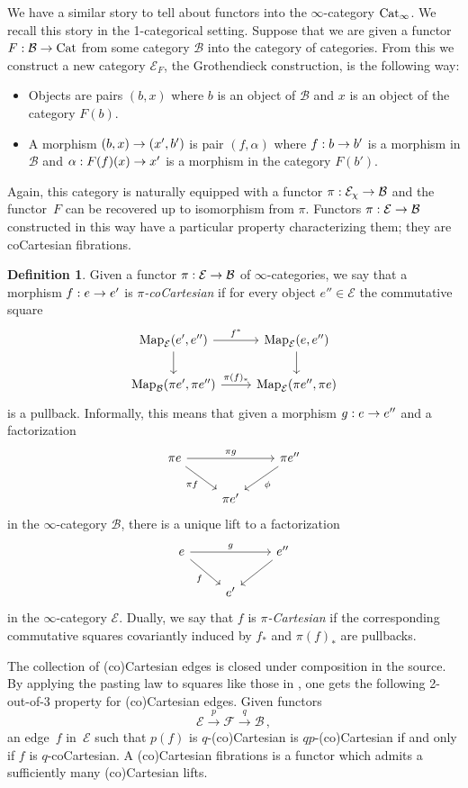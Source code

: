 \documentclass[10pt]{amsart}
\numberwithin{equation}{section}
\theoremstyle{definition}
\newtheorem{definition}[prop]{Definition}
\DeclareMathOperator{\Map}{Map}
\newcommand{\Cat}{\mathrm{Cat}\vphantom{t}}
\newcommand{\cB}{\mathcal{B}}
\newcommand{\cE}{\mathcal{E}}
\newcommand{\cF}{\mathcal{F}}
\renewcommand{\to}{\mathchoice{\longrightarrow}{\rightarrow}{}{}}
\begin{document}
	We have a similar story to tell about functors into the $\infty$-category $\Cat_{\infty}$.
	We recall this story in the 1-categorical setting.
	Suppose that we are given a functor $F : \mathcal{B} \to \Cat$ from some category $\mathcal{B}$ into the category of categories.
	From this we construct a new category $\mathcal{E}_{F}$, the Grothendieck construction, is the following way:
	\begin{itemize}
		\item Objects are pairs $(b,x)$ where $b$ is an object of $\mathcal{B}$ and $x$ is an object of the category $F(b)$.
		\item A morphism $(b,x) \to (x',b')$ is pair $(f,\alpha)$ where $f : b \to b'$ is a morphism in $\mathcal{B}$ and $\alpha : F(f)(x) \to x'$ is a morphism in the category $F(b')$.
	\end{itemize}
	Again, this category is naturally equipped with a functor $\pi : \mathcal{E}_{\chi} \to \mathcal{B}$ and the functor~$F$ can be recovered up to isomorphism from $\pi$.
	Functors $\pi : \mathcal{E} \to \mathcal{B}$ constructed in this way have a particular property characterizing them; they are coCartesian fibrations.

	\begin{definition}\label{def:cocart_edge}
		Given a functor $\pi : \cE \to \cB$ of $\infty$-categories, we say that a morphism $f : e \to e'$ is \emph{$\pi$-coCartesian} if for every object $e'' \in \cE$ the commutative square
		\[
		\begin{tikzcd}
			\Map_{\cE}(e',e'') \arrow[r,"f^*"] \arrow[d] & \Map_{\cE}(e,e'') \arrow[d] \\
			\Map_{\cB}(\pi e' , \pi e'') \arrow[r,"\pi(f)_*"] & \Map_{\cE}(\pi e'' , \pi e)
		\end{tikzcd}
		\]
		is a pullback.
		Informally, this means that given a morphism $g : e \to e''$ and a factorization
		\[
		\begin{tikzcd}
			\pi e \arrow[rr,"\pi g"] \arrow [dr,"\pi f"'] & & \pi e'' \arrow[dl,"\phi"] \\
			& \pi e' &
		\end{tikzcd}
		\]
		in the $\infty$-category $\cB$, there is a unique lift to a factorization
		\[
		\begin{tikzcd}
			e \arrow[rr,"g"] \arrow [dr,"f"'] & & e'' \arrow[dl] \\
			& e' &
		\end{tikzcd}
		\]
		in the $\infty$-category $\cE$.
		Dually, we say that $f$ is \emph{$\pi$-Cartesian} if the corresponding commutative squares covariantly induced by $f_*$ and $\pi(f)_*$ are pullbacks.
	\end{definition}
	The collection of (co)Cartesian edges is closed under composition in the source. By applying the pasting law to squares like those in , one gets the following 2-out-of-3 property for (co)Cartesian edges.
  Given functors
  \[
  \cE\xrightarrow{p} \cF \xrightarrow{q} \cB \,,
  \] an edge~$f$ in~$\cE$ such that $p(f)$ is $q$-(co)Cartesian is $qp$-(co)Cartesian if and only if $f$ is $q$-coCartesian.
	A (co)Cartesian fibrations is a functor which admits a sufficiently many (co)Cartesian lifts.
\end{document}

